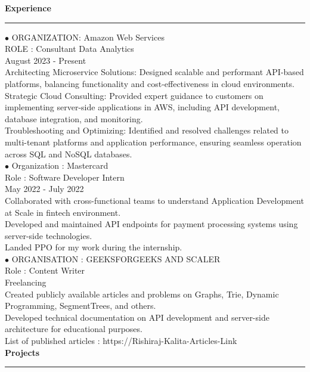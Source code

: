 \documentclass[11pt,a4paper]{article}
\renewcommand{\section}[1]{%
  \vspace{12pt}%
  {\large\bfseries #1}%
  \vspace{6pt}%
  \hrule%
  \vspace{6pt}%
}
\begin{document}
\section{Experience}

\noindent $\bullet$ ORGANIZATION: Amazon Web Services\\[0.2cm]
ROLE : Consultant Data Analytics\\[0.2cm]
August 2023 - Present\\[0.2cm]
Architecting Microservice Solutions: Designed scalable and performant API-based platforms, balancing functionality and cost-effectiveness in cloud environments.\\[0.2cm]
Strategic Cloud Consulting: Provided expert guidance to customers on implementing server-side applications in AWS, including API development, database integration, and monitoring.\\[0.2cm]
Troubleshooting and Optimizing: Identified and resolved challenges related to multi-tenant platforms and application performance, ensuring seamless operation across SQL and NoSQL databases.\\[0.2cm]
\noindent $\bullet$ Organization : Mastercard\\[0.2cm]
Role : Software Developer Intern\\[0.2cm]
May 2022 - July 2022\\[0.2cm]
Collaborated with cross-functional teams to understand Application Development at Scale in fintech environment.\\[0.2cm]
Developed and maintained API endpoints for payment processing systems using server-side technologies.\\[0.2cm]
Landed PPO for my work during the internship.\\[0.2cm]
\noindent $\bullet$ ORGANISATION : GEEKSFORGEEKS AND SCALER\\[0.2cm]
Role : Content Writer\\[0.2cm]
Freelancing\\[0.2cm]
Created publicly available articles and problems on Graphs, Trie, Dynamic Programming, SegmentTrees, and others.\\[0.2cm]
Developed technical documentation on API development and server-side architecture for educational purposes.\\[0.2cm]
List of published articles : https://Rishiraj-Kalita-Articles-Link\\[0.2cm]
\section{Projects}
\end{document}
